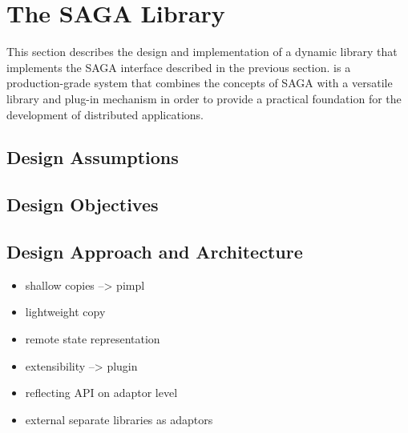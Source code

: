\section{The SAGA Library}

  This section describes the design and implementation of a dynamic library 
  that implements the SAGA interface described in the previous section.
  \thesagaimpl is a production-grade system that combines the concepts of SAGA
  with a versatile library and plug-in mechanism in order to provide a
  practical foundation for the development of distributed applications.



  \subsection{Design Assumptions} 

  

  \subsection{Design Objectives}

  \subsection{Design Approach and Architecture}


    \begin{itemize}
 \item  shallow copies --> pimpl
 \item  lightweight copy
 \item  remote state representation

 \item  extensibility --> plugin
       \item reflecting API on adaptor level
      \item external separate libraries as adaptors
    \end{itemize}

